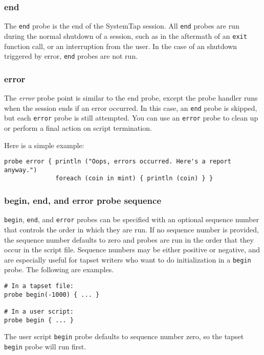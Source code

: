\documentclass[twoside,english]{article}
\newenvironment{vindent}
{\begin{list}{}{\setlength{\listparindent}{6pt}}
\item[]}
{\end{list}}
\begin{document}
\subsubsection{end}
The \texttt{end} probe is the end of the SystemTap session. All \texttt{end}
probes are run during the normal shutdown of a session, such as in the aftermath
of an \texttt{exit} function call, or an interruption from the user. In the
case of an shutdown triggered by error, \texttt{end} probes are not run.


\subsubsection{error}
The \emph{error} probe point is similar to the end
probe, except the probe handler runs when the session ends if an error
occurred.  In this case, an \texttt{end} probe is skipped, but each
\texttt{error} probe is still attempted.  You can use an
\texttt{error} probe to clean up or perform a final action on script
termination.

Here is a simple example:
\begin{vindent}
\begin{verbatim}
probe error { println ("Oops, errors occurred. Here's a report anyway.")
              foreach (coin in mint) { println (coin) } }
\end{verbatim}
\end{vindent}


\subsubsection{begin, end, and error probe sequence}
\texttt{begin}, \texttt{end}, and \texttt{error} probes can be
specified with an optional sequence number that controls the order in
which they are run. If no sequence number is provided, the sequence
number defaults to zero and probes are run in the order that they
occur in the script file. Sequence numbers may be either positive or
negative, and are especially useful for tapset writers who want to do
initialization in a \texttt{begin} probe. The following are examples.

\begin{vindent}
\begin{verbatim}
# In a tapset file:
probe begin(-1000) { ... }

# In a user script:
probe begin { ... }
\end{verbatim}
\end{vindent}
The user script \texttt{begin} probe defaults to sequence number zero, so
the tapset \texttt{begin} probe will run first.
\end{document}
